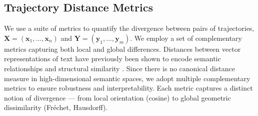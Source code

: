 \documentclass[a4paper,12pt]{article}
\begin{document}
\subsection{Trajectory Distance Metrics}
\label{subsec:trajectory_distance_metrics}
We use a suite of metrics to quantify the divergence between pairs of trajectories, $\mathbf{X} = (\mathbf{x}_1, ..., \mathbf{x}_n)$ and $\mathbf{Y} = (\mathbf{y}_1, ..., \mathbf{y}_m)$. We employ a set of complementary metrics capturing both local and global differences. Distances between vector representations of text have previously been shown to encode semantic relationships and structural similarity \cite{text2vec, reimers2019sentencebertsentenceembeddingsusing}. Since there is no canonical distance measure in high-dimensional semantic spaces, we adopt multiple complementary metrics to ensure robustness and interpretability. Each metric captures a distinct notion of divergence — from local orientation (cosine) to global geometric dissimilarity (Fréchet, Hausdorff).

\end{document}
